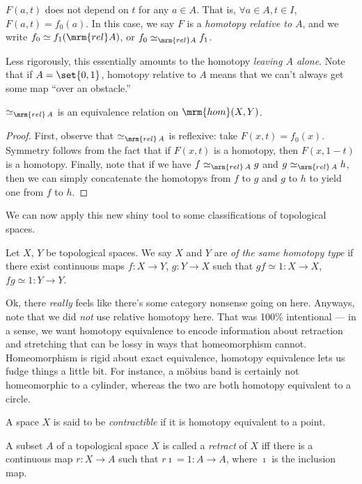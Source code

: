 \documentclass{fkbook}
\newcommand{\homm}{\mrm{hom}}
\newcommand{\htop}[1][A]{\ensuremath\simeq_{\mrm{rel}\, #1}}
\begin{document}
\begin{adjustwidth}{1em}{1em}
\begin{definition}
    $F(a,t)$ does not depend on $t$ for any $a \in A$. That is,
    $\forall a \in A, t \in I$, $F(a,t) = f_0(a)$. In this case, we
    say $F$ is a \emph{homotopy relative to $A$}, and we write $f_0
    \simeq f_1 (\mrm{rel} A)$, or $f_0 \simeq_{\mrm{rel} A} f_1$.
  \end{definition}
  Less rigorously, this essentially amounts to the homotopy
  \emph{leaving $A$ alone}. Note that if $A = \set{0,1}$, homotopy
  relative to $A$ means that we can't always get some map ``over an
  obstacle.''
  \begin{lemma}
    $\htop$ is an equivalence relation on $\homm(X,Y)$.
  \end{lemma}
  \begin{proof}
    First, observe that $\htop$ is reflexive: take $F(x,t) = f_0(x)$.
    Symmetry follows from the fact that if $F(x,t)$ is a homotopy,
    then $F(x, 1-t)$ is a homotopy. Finally, note that if we have $f
    \htop g$ and $g \htop h$, then we can simply concatenate the
    homotopys from $f$ to $g$ and $g$ to $h$ to yield one from $f$ to
    $h$.
  \end{proof}
  We can now apply this new shiny tool to some classifications of
  topological spaces.
  \begin{definition}
    Let $X$, $Y$ be topological spaces. We say $X$ and $Y$ are
    \emph{of the same homotopy type} if there exist continuous maps $f
    : X \to Y$, $g : Y \to X$ such that $gf \simeq 1 : X \to X$, $fg
    \simeq 1 : Y \to Y$.
  \end{definition}
  Ok, there \emph{really} feels like there's some category nonsense
  going on here. Anyways, note that we did \emph{not} use relative
  homotopy here. That was 100\% intentional --- in a sense, we want
  homotopy equivalence to encode information about retraction and
  stretching that can be lossy in ways that homeomorphism cannot.
  Homeomorphism is rigid about exact equivalence, homotopy equivalence
  lets us fudge things a little bit. For instance, a m\"{o}bius band
  is certainly not homeomorphic to a cylinder, whereas the two are
  both homotopy equivalent to a circle.
  \begin{definition}
    A space $X$ is said to be \emph{contractible} if it is homotopy
    equivalent to a point.
  \end{definition}
  \begin{definition}
    A subset $A$ of a topological space $X$ is called a \emph{retract}
    of $X$ iff there is a continuous map $r : X \to A$ such that
    $r\imath = 1 : A \to A$, where $\imath$ is the inclusion map.

\end{definition}
\end{adjustwidth}
\end{document}

